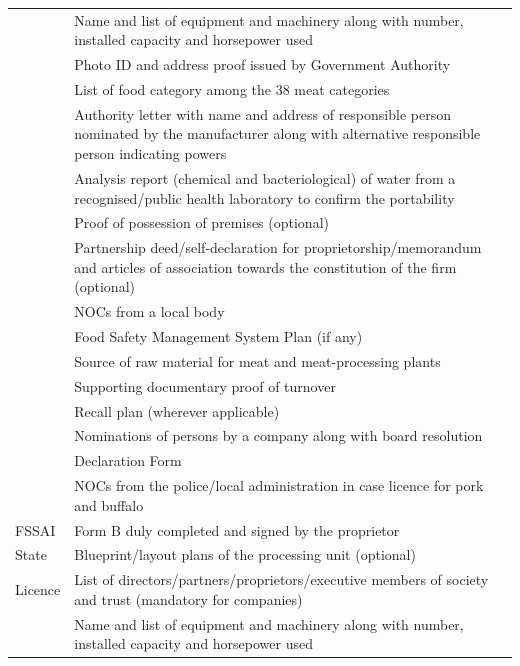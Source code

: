 \documentclass[a4paper, 12pt]{article}
\begin{document}
\begin{longtable}{>{\raggedright}p{2.5cm}>{\raggedright\arraybackslash}p{13cm}}
    \multicolumn{1}{r}{} & Name and list of equipment and machinery along with number, installed capacity and horsepower used \\
    \multicolumn{1}{r}{} & Photo ID and address proof issued by Government Authority \\
    \multicolumn{1}{r}{} & List of food category among the 38 meat categories \\
    \multicolumn{1}{r}{} & Authority letter with name and address of responsible person nominated by the manufacturer along with alternative responsible person indicating powers   \\
    \multicolumn{1}{r}{} & Analysis report (chemical and bacteriological) of water from a recognised/public health laboratory to confirm the portability \\
    \multicolumn{1}{r}{} & Proof of possession of premises (optional) \\
    \multicolumn{1}{r}{} & Partnership deed/self-declaration for proprietorship/memorandum and articles of association towards the constitution of the firm (optional) \\
    \multicolumn{1}{r}{} & NOCs from a local body \\
    \multicolumn{1}{r}{} & Food Safety Management System Plan (if any) \\
    \multicolumn{1}{r}{} & Source of raw material for meat and meat-processing plants \\
    \multicolumn{1}{r}{} & Supporting documentary proof of turnover \\
    \multicolumn{1}{r}{} & Recall plan (wherever applicable) \\
    \multicolumn{1}{r}{} & Nominations of persons by a company along with board resolution \\
    \multicolumn{1}{r}{} & Declaration Form \\
    \multicolumn{1}{r}{} & NOCs from the police/local administration in case licence for pork and buffalo  \\
    \midrule
    FSSAI & Form B duly completed and signed by the proprietor\\
   State & Blueprint/layout plans of the processing unit (optional) \\
    Licence & List of directors/partners/proprietors/executive members of society and trust (mandatory for companies) \\
    \multicolumn{1}{r}{} & Name and list of equipment and machinery along with number, installed capacity and horsepower used \\

\end{longtable}
\end{document}
